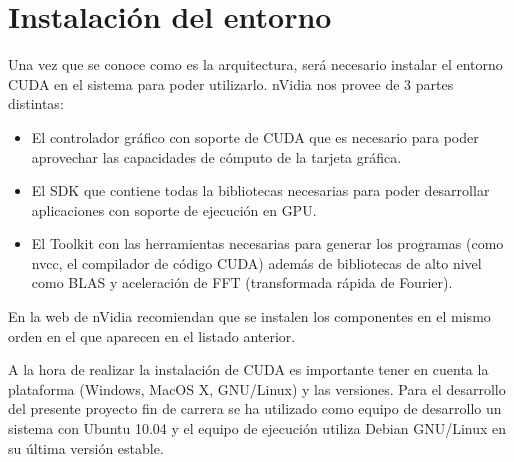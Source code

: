 \section{Instalación del entorno}

Una vez que se conoce como es la arquitectura, será necesario instalar el entorno CUDA en el sistema para poder utilizarlo. nVidia nos provee de 3 partes distintas:

\begin{itemize}
	\item El controlador gráfico con soporte de CUDA que es necesario para poder aprovechar las capacidades de cómputo de la tarjeta gráfica.
	\item El SDK que contiene todas la bibliotecas necesarias para poder desarrollar aplicaciones con soporte de ejecución en GPU.
	\item El Toolkit con las herramientas necesarias para generar los programas (como nvcc, el compilador de código CUDA) además de bibliotecas de alto nivel como BLAS y aceleración de FFT (transformada rápida de Fourier).
\end{itemize}

En la web de nVidia recomiendan que se instalen los componentes en el mismo orden en el que aparecen en el listado anterior.

A la hora de realizar la instalación de CUDA es importante tener en cuenta la plataforma (Windows, MacOS X, GNU/Linux) y las versiones. Para el desarrollo del presente proyecto fin de carrera se ha utilizado como equipo de desarrollo un sistema con Ubuntu 10.04 y el equipo de ejecución utiliza Debian GNU/Linux en su última versión estable.
